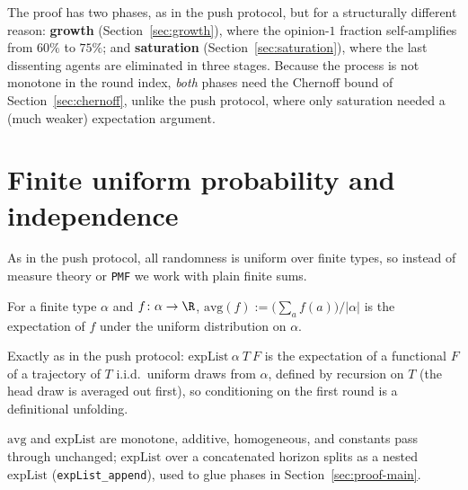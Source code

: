 The proof has two phases, as in the push protocol, but for a structurally
different reason: \textbf{growth} (Section~\ref{sec:growth}), where the
opinion-$1$ fraction self-amplifies from $60\%$ to $75\%$; and
\textbf{saturation} (Section~\ref{sec:saturation}), where the last
dissenting agents are eliminated in three stages. Because the process is
not monotone in the round index, \emph{both} phases need the Chernoff bound
of Section~\ref{sec:chernoff}, unlike the push protocol, where only
saturation needed a (much weaker) expectation argument.

\section{Finite uniform probability and independence}\label{sec:prelim}

As in the push protocol, all randomness is uniform over finite types, so
instead of measure theory or \texttt{PMF} we work with plain finite sums.

\begin{definition}[Average]\label{def:avg}
  \leanok
  For a finite type $\alpha$ and $f \colon \alpha \to \R$,
  $\mathrm{avg}(f) := \bigl(\sum_a f(a)\bigr)/|\alpha|$ is the expectation of
  $f$ under the uniform distribution on $\alpha$.
\end{definition}

\begin{definition}\label{def:expList}
  \leanok
  Exactly as in the push protocol: $\mathrm{expList}\ \alpha\ T\ F$ is the
  expectation of a functional $F$ of a trajectory of $T$ i.i.d.\ uniform
  draws from $\alpha$, defined by recursion on $T$ (the head draw is
  averaged out first), so conditioning on the first round is a definitional
  unfolding.
\end{definition}

\begin{lemma}\label{lem:avg-basic}
  \leanok
  $\mathrm{avg}$ and $\mathrm{expList}$ are monotone, additive, homogeneous,
  and constants pass through unchanged; $\mathrm{expList}$ over a
  concatenated horizon splits as a nested $\mathrm{expList}$
  (\texttt{expList\_append}), used to glue phases in
  Section~\ref{sec:proof-main}.
\end{lemma}

